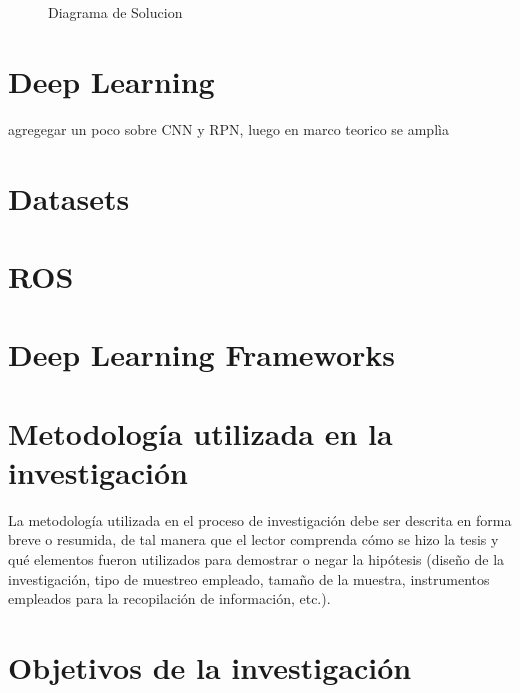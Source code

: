 \begin{figure}
	\centering
	
	\caption{Diagrama de Solucion} \label{fig:DiagramaDeSolucion} 
\end{figure}

\newpage





\section{Deep Learning}
agregegar un poco sobre CNN y RPN, luego en marco teorico se amplìa


\section{Datasets}


\section{ROS}



\section{Deep Learning Frameworks}




\section{Metodología utilizada en la investigación}
La metodología utilizada en el proceso de investigación debe ser descrita en forma breve o resumida, de tal manera que el lector comprenda cómo se hizo la tesis y qué elementos fueron utilizados para demostrar o negar la hipótesis (diseño de la investigación, tipo de muestreo empleado, tamaño de la muestra, instrumentos empleados para la recopilación de información, etc.).


\newpage




\section{Objetivos de la investigación}

